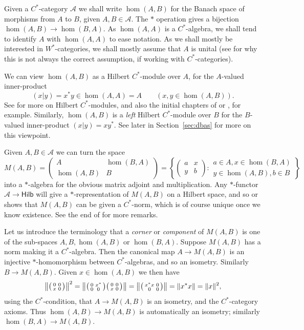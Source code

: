 \documentclass[a4paper,11pt]{article}
\theoremstyle{plain}
\theoremstyle{remark}
\newenvironment{remark}
  {\pushQED{\qed}\renewcommand{\qedsymbol}{$\triangle$}\remarkx}
  {\popQED\endremarkx}
\newcommand{\mc}[1]{\mathcal{#1}}
\newcommand{\catHilb}{\textsf{Hilb}}
\newenvironment{smat}{\bigl(\begin{smallmatrix}}{\end{smallmatrix}\bigr)}
\newcommand{\smattwo}[4]{\begin{smat}{#1}&{#2}\\{#3}&{#4}\end{smat}}
\begin{document}
Given a $C^*$-category $\mc A$ we shall write $\hom(A,B)$ for the Banach space of morphisms from $A$ to $B$, given $A,B\in\mc A$.  The $*$ operation gives a bijection $\hom(A,B) \to \hom(B,A)$.  As $\hom(A,A)$ is a $C^*$-algebra, we shall tend to identify $A$ with $\hom(A,A)$ to ease notation.  As we shall mostly be interested in $W^*$-categories, we shall mostly assume that $A$ is unital (see \cite[Section~3]{mitchener_cstar_cats} for why this is not always the correct assumption, if working with $C^*$-categories).

We can view $\hom(A,B)$ as a Hilbert $C^*$-module over $A$, for the $A$-valued inner-product
\[ (x|y) = x^*y \in \hom(A,A) = A \qquad (x,y\in\hom(A,B)). \]
See \cite{Lance_HilbModsBook} for more on Hilbert $C^*$-modules, and also the initial chapters of \cite{RaeburnWilliams_MoritaEquivBook} or \cite[Chapter~8]{BlecherLeMerdy_Book}, for example.  Similarly, $\hom(A,B)$ is a \emph{left} Hilbert $C^*$-module over $B$ for the $B$-valued inner-product $(x|y) = xy^*$.  See later in Section~\ref{sec:dbas} for more on this viewpoint.

Given $A,B\in\mc A$ we can turn the space
\[ M(A,B) = \begin{pmatrix} A & \hom(B,A) \\ \hom(A,B) & B \end{pmatrix}
= \left\{ \begin{pmatrix} a & x \\ y & b \end{pmatrix} : \begin{matrix} a\in A, x\in\hom(B,A) \\
  y \in\hom(A, B), b\in B \end{matrix} 
  \right\} \]  
into a $*$-algebra for the obvious matrix adjoint and multiplication.  Any $*$-functor $\mc A \to \catHilb$ will give a $*$-representation of $M(A,B)$ on a Hilbert space, and so \cite[Proposition~1.14]{GLR_Wstar_categories} or \cite[Section~6]{mitchener_cstar_cats} shows that $M(A,B)$ can be given a $C^*$-norm, which is of course unique once we know existence.  See the end of \cite[Section~1]{GLR_Wstar_categories} for more remarks.

\begin{remark}\label{rem:coms_iso}
Let us introduce the terminology that a \emph{corner} or \emph{component} of $M(A,B)$ is one of the sub-spaces $A,B,\hom(A,B)$ or $\hom(B,A)$.  Suppose $M(A,B)$ has a norm making it a $C^*$-algebra.  Then the canonical map $A \to M(A,B)$ is an injective $*$-homomorphism between $C^*$-algebras, and so an isometry.  Similarly $B\to M(A,B)$.  Given $x\in\hom(A,B)$ we then have
\[ \left\|\smattwo{0}{0}{x}{0}\right\|^2
= \left\| \smattwo{0}{x^*}{0}{0} \smattwo{0}{0}{x}{0} \right\|
= \left\| \smattwo{x^*x}{0}{0}{0} \right\|
= \|x^*x\| = \|x\|^2, \]
using the $C^*$-condition, that $A\to M(A,B)$ is an isometry, and the $C^*$-category axioms.  Thus $\hom(A,B) \to M(A,B)$ is automatically an isometry; similarly $\hom(B,A) \to M(A,B)$.
\end{remark}
\end{document}
